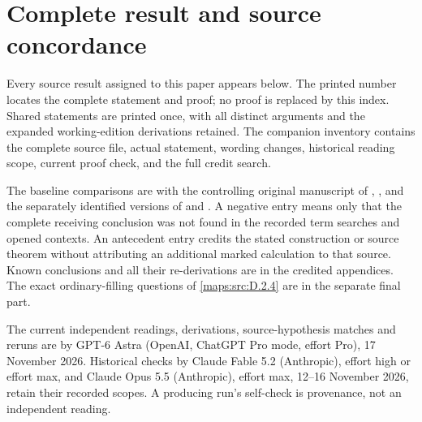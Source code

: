 \section{Complete result and source concordance}\label{app:III:result-index}
Every source result assigned to this paper appears below. The printed number
locates the complete statement and proof; no proof is replaced by this
index. Shared statements are printed once, with all distinct arguments and
the expanded working-edition derivations retained. The companion inventory
contains the complete source file, actual statement, wording changes,
historical reading scope, current proof check, and the full credit search.

The baseline comparisons are with the controlling original manuscript of
\citet{AC26}, \citet{E26}, and the separately identified versions of
\citet{DuEtAl2026v1} and \citet{DuEtAl2026v2}. A negative entry means only that the
complete receiving conclusion was not found in the recorded term searches
and opened contexts. An antecedent entry credits the stated construction
or source theorem without attributing an additional marked calculation to
that source. Known conclusions and all their re-derivations are in the
credited appendices. The exact ordinary-filling questions of
\cref{maps:src:D.2.4} are in the separate final part.

The current independent readings, derivations, source-hypothesis matches
and reruns are by GPT-6 Astra (OpenAI, ChatGPT Pro mode, effort Pro),
17 November 2026. Historical checks by Claude Fable 5.2 (Anthropic),
effort high or effort max, and Claude Opus 5.5 (Anthropic), effort max,
12--16 November 2026, retain their recorded scopes. A producing run's
self-check is provenance, not an independent reading.

